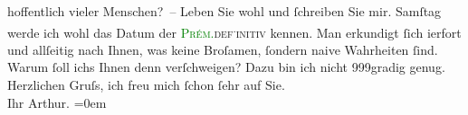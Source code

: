                hoffentlich vieler Menschen? – \pend
           \pstart
           {\pb}Leben Sie wohl und ſchreiben Sie mir.
                  Samſtag werde ich wohl das Datum der \textcolor{green}{\textsc{Prém.}}{}\textsc{def}\substVorne{}\textsuperscript{.}\substDazwischen{}\textsc{initiv}\substHinten{} kennen.\pend
           \pstart
           Man erkundigt ſich i{\geminationm}erfort und allſeitig nach Ihnen,
               was keine Broſamen, ſondern naive Wahrheiten {\pb}ſind.
               Warum ſoll ichs Ihnen denn verſchweigen? Dazu bin ich nicht 999gradig genug.\pend
           \pstart
           Herzlichen Gruſs, ich freu mich ſchon ſehr auf Sie.{\\[\baselineskip]}Ihr
                  \spacefill\mbox{Arthur.}\pend
           \leftskip=0em{}\endnumbering{}  
      
